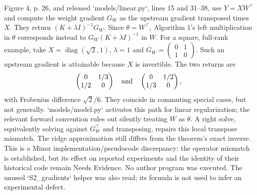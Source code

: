 \documentclass[10pt]{article}
\begin{document}
Figure 4, p. 26, and released `models/linear.py`, lines 15 and 31–38, use \(Y=XW^\top\) and compute the weight gradient \(G_W\) as the upstream gradient transposed times \(X\). They return \((K+\lambda I)^{-1}G_W\). Since \(\theta=W^\top\), Algorithm 1’s left multiplication in \(\theta\) corresponds instead to \(G_W(K+\lambda I)^{-1}\) in \(W\). For a square, full-rank example, take \(X=\operatorname{diag}(\sqrt2,1)\), \(\lambda=1\) and \(G_W=\left(\begin{smallmatrix}0&1\\1&0\end{smallmatrix}\right)\). Such an upstream gradient is attainable because \(X\) is invertible. The two returns are \[\begin{pmatrix}0&1/3\\1/2&0\end{pmatrix}\quad\hbox{and}\quad
\begin{pmatrix}0&1/2\\1/3&0\end{pmatrix},\] with Frobenius difference \(\sqrt2/6\). They coincide in commuting special cases, but not generally. `models/model.py` activates this path for linear regularization; the relevant forward convention rules out silently treating \(W\) as \(\theta\). A right solve, equivalently solving against \(G_W^\top\) and transposing, repairs this local transpose mismatch. The ridge approximation still differs from the theorem’s exact inverse. This is a Minor implementation/pseudocode discrepancy: the operator mismatch is established, but its effect on reported experiments and the identity of their historical code remain Needs Evidence. No author program was executed. The unused `S2\_gradients` helper was also read; its formula is not used to infer an experimental defect.\par
\end{document}
